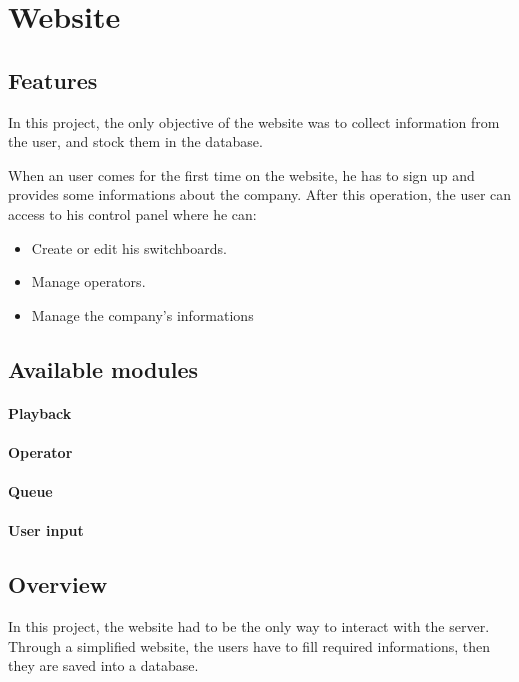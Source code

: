 \chapter{Website}
\section{Features}
In this project, the only objective of the website was to collect information from the user, and stock them in the database.

When an user comes for the first time on the website, he has to sign up and provides some informations about the company. After this operation, the user can access to his control panel where he can:
\begin{itemize}  
\item Create or edit his switchboards.
\item Manage operators\footnotemark.
\item Manage the company's informations
\end{itemize}  



\section{Available modules}

\subsubsection{Playback}

\subsubsection{Operator}

\subsubsection{Queue}
\subsubsection{User input}



\section{Overview}
In this project, the website had to be the only way to interact with the server. Through a simplified website, the users have to fill required informations, then they are saved into a database.
\newline

